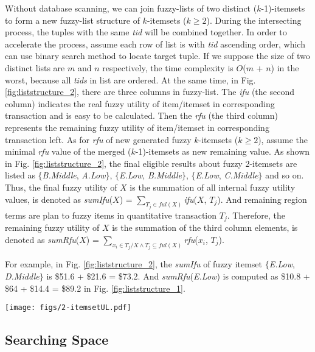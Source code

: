 \documentclass[journal]{IEEEtran}
\begin{document}
Without database scanning, we can join fuzzy-lists of two distinct ($k$-1)-itemsets to form a new fuzzy-list structure of $k$-itemsets ($k \ge 2$). During the intersecting process, the tuples with the same \textit{tid} will be combined together. In order to accelerate the process, assume each row of list is with \textit{tid} ascending order, which can use binary search method to locate target tuple. If we suppose the size of two distinct lists are $m$ and $n$ respectively, the time complexity is $O$($m$ + $n$) in the worst, because all \textit{tids} in list are ordered. At the same time, in Fig. \ref{fig:liststructure_2}, there are three columns in fuzzy-list. The \textit{ifu} (the second column) indicates the real fuzzy utility of item/itemset in corresponding transaction and is easy to be calculated. Then the \textit{rfu} (the third column) represents the remaining fuzzy utility of item/itemset in corresponding transaction left.  As for \textit{rfu} of new generated fuzzy $k$-itemsets ($k \ge 2$), assume the minimal \textit{rfu} value of the merged ($k$-1)-itemsets as new remaining value. As shown in Fig. \ref{fig:liststructure_2}, the final eligible results about fuzzy 2-itemsets are listed as $\{$\textit{B.Middle}, \textit{A.Low}$\}$, $\{$\textit{E.Low}, \textit{B.Middle}$\}$, $\{$\textit{E.Low}, \textit{C.Middle}$\}$ and so on. Thus, the final fuzzy utility of $X$ is the summation of all internal fuzzy utility values, is denoted as \textit{sumIfu}($X$) = $\sum_{T_j \in ful(X)}$\textit{ifu}($X$, $T_j$). And remaining region terms are plan to fuzzy items in quantitative transaction $T_j$. Therefore, the remaining fuzzy utility of $X$ is the summation of the third column elements, is denoted as \textit{sumRfu}($X$) = $\sum_{x_i \in T_j / X \land T_j \subseteq ful(X)}$\textit{rfu}($x_i$, $T_j$).

For example, in Fig. \ref{fig:liststructure_2}, the \textit{sumIfu} of fuzzy itemset $\{$\textit{E.Low}, \textit{D.Middle}$\}$ is \$51.6 + \$21.6 = \$73.2. And \textit{sumRfu}(\textit{E.Low}) is computed as \$10.8 + \$64 + \$14.4 = \$89.2 in Fig. \ref{fig:liststructure_1}.


\begin{figure*}[hbtp]
	\centering
	\texttt{[image: figs/2-itemsetUL.pdf]}
	\caption{The fuzzy-list structures of fuzzy 2-itemsets.}
	\label{fig:liststructure_2}
\end{figure*}


\subsection{Searching Space}
\end{document}
